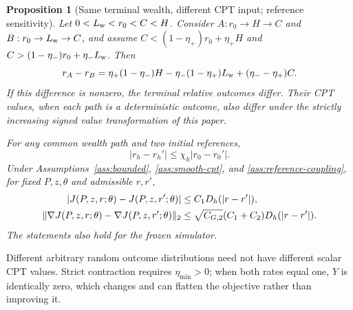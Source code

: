 \documentclass[11pt]{article}
\newtheorem{proposition}[theorem]{Proposition}
\newcommand{\1}{\mathbf 1}
\DeclarePairedDelimiter{\norm}{\lVert}{\rVert}
\begin{document}
\begin{proposition}[Same terminal wealth, different CPT input; reference sensitivity]\label{prop:path-dependence}
Let $0<L_{\rm w}<r_0<C<H$. Consider $A:r_0\to H\to C$ and $B:r_0\to L_{\rm w}\to C$, and assume
$C<(1-\eta_+)r_0+\eta_+H$ and $C>(1-\eta_-)r_0+\eta_-L_{\rm w}$.
Then
\begin{equation}\label{eq:path-diff}
 r_A-r_B=\eta_+(1-\eta_-)H-\eta_-(1-\eta_+)L_{\rm w}+(\eta_--\eta_+)C.
\end{equation}
If this difference is nonzero, the terminal relative outcomes differ. Their CPT values, when each path is a deterministic outcome, also differ under the strictly increasing signed value transformation of this paper.

For any common wealth path and two initial references,
\begin{equation}\label{eq:reference-contraction}
 |r_h-r_h'|\le\chi_h|r_0-r_0'|.
\end{equation}
Under Assumptions~\ref{ass:bounded}, \ref{ass:smooth-cpt}, and \ref{ass:reference-coupling}, for fixed $P,z,\theta$ and admissible $r,r'$,
\begin{align}
 |J(P,z,r;\theta)-J(P,z,r';\theta)|
 &\le C_1D_h(|r-r'|),\label{eq:reference-value-sensitivity}\\
 \norm{\nabla J(P,z,r;\theta)-\nabla J(P,z,r';\theta)}_2
 &\le \sqrt{C_{G,2}}(C_1+C_2)D_h(|r-r'|).\label{eq:reference-gradient-sensitivity}
\end{align}
The statements also hold for the frozen simulator.
\end{proposition}
Different arbitrary random outcome distributions need not have different scalar CPT values. Strict contraction requires $\eta_{\min}>0$; when both rates equal one, $Y$ is identically zero, which changes and can flatten the objective rather than improving it.
\end{document}
